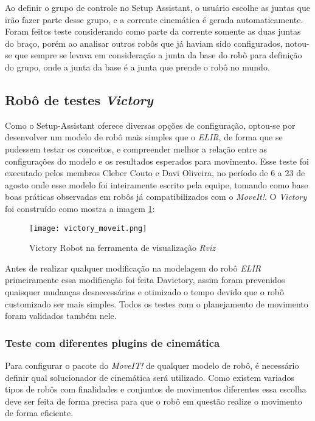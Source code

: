 Ao definir o grupo de controle no Setup Assistant, o usuário escolhe as juntas que irão fazer parte desse grupo, e a corrente cinemática é gerada automaticamente. Foram feitos teste considerando como parte da corrente somente as duas juntas do braço, porém ao analisar outros robôs que já haviam sido configurados, notou-se que sempre se levava em consideração a junta da base do robô para definição do grupo, onde a junta da base é a junta que prende o robô no mundo.

\subsection{Robô de testes \textit{Victory}}
Como o Setup-Assistant oferece diversas opções de configuração, optou-se por desenvolver um modelo de robô mais simples que o \textit{ELIR}, de forma que se pudessem testar os conceitos, e compreender melhor a relação entre as configurações do modelo e os resultados esperados para movimento.
Esse teste foi executado pelos membros Cleber Couto e Davi Oliveira, no período de 6 a 23 de agosto onde esse modelo foi inteiramente escrito pela equipe, tomando como base boas práticas observadas em robôs já compatibilizados com o \textit{MoveIt!}. O \textit{Victory} foi construído como mostra a imagem \ref{img:victory}:

\begin{figure}[h!]												
	\centering												
	\texttt{[image: victory\_moveit.png]}				
	\caption{Victory Robot na ferramenta de visualização \textit{Rviz}}		
	\label{img:victory}
\end{figure}

Antes de realizar qualquer modificação na modelagem do robô \textit{ELIR} primeiramente essa modificação foi feita Davictory, assim foram prevenidos quaisquer mudanças desnecessárias e otimizado o tempo devido que o robô customizado ser mais simples. Todos os testes com o planejamento de movimento foram validados também nele.

\subsubsection{Teste com diferentes plugins de cinemática}
Para configurar o pacote do \textit{MoveIT!} de qualquer modelo de robô, é necessário definir qual solucionador de cinemática será utilizado. Como existem variados tipos de robôs com finalidades e conjuntos de movimentos diferentes essa escolha deve ser feita de forma precisa para que o robô em questão realize o movimento de forma eficiente.

